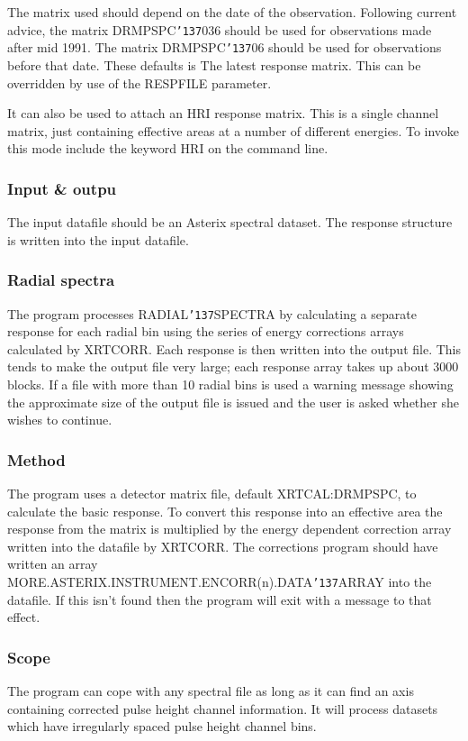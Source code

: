 \documentclass{book}
\renewcommand{\_}{{\tt\char'137}}     %
\begin{document}
The matrix used should depend on the date of the observation.
Following current advice, the matrix DRMPSPC\_036 should be used for
observations made after mid 1991. The matrix DRMPSPC\_06 should be used
for observations before that date. These defaults is The latest
response matrix. This can be overridden by use of the RESPFILE
parameter.

It can also be used to attach an HRI response matrix. This is a
single channel matrix, just containing effective areas at a number
of different energies. To invoke this mode include the keyword
HRI on the command line.

\subsubsection{Input \& outpu}
The input datafile should be an Asterix spectral dataset.
The response structure is written into the input datafile.

\subsubsection{Radial spectra}
The program processes RADIAL\_SPECTRA by calculating a separate
response for each radial bin using the series of energy corrections
arrays calculated by XRTCORR. Each response is then written into
the output file. This tends to make the output file very large;
each response array takes up about 3000 blocks. If a file with
more than 10 radial bins is used a warning message showing the
approximate size of the output file is issued and the user is
asked whether she wishes to continue.

\subsubsection{Method}
The program uses a detector matrix file, default XRTCAL:DRMPSPC,
to calculate the basic response. To convert this response into an
effective area the response from the matrix is multiplied by the
energy dependent correction array written into the datafile by
XRTCORR. The corrections program should have written an array
MORE.ASTERIX.INSTRUMENT.ENCORR(n).DATA\_ARRAY into the datafile. If
this isn't found then the program will exit with a message to that
effect.

\subsubsection{Scope}
The program can cope with any spectral file as long as it can find
an axis containing corrected pulse height channel information. It
will process datasets which have irregularly spaced pulse height
channel bins.
\end{document}
